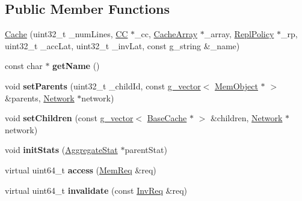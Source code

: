 \subsection*{Public Member Functions}
\begin{DoxyCompactItemize}
\item 
\hyperlink{classCache_a398112ee381973ef3777746a31900320}{Cache} (uint32\-\_\-t \-\_\-num\-Lines, \hyperlink{classCC}{C\-C} $\ast$\-\_\-cc, \hyperlink{classCacheArray}{Cache\-Array} $\ast$\-\_\-array, \hyperlink{classReplPolicy}{Repl\-Policy} $\ast$\-\_\-rp, uint32\-\_\-t \-\_\-acc\-Lat, uint32\-\_\-t \-\_\-inv\-Lat, const g\-\_\-string \&\-\_\-name)
\item 
\hypertarget{classCache_a723ba68ec1f3e8d46b536e003d2d31d4}{const char $\ast$ {\bfseries get\-Name} ()}\label{classCache_a723ba68ec1f3e8d46b536e003d2d31d4}

\item 
\hypertarget{classCache_a79ba01ab96d6949c8cf3f71cf310d9bd}{void {\bfseries set\-Parents} (uint32\-\_\-t \-\_\-child\-Id, const \hyperlink{classg__vector}{g\-\_\-vector}$<$ \hyperlink{classMemObject}{Mem\-Object} $\ast$ $>$ \&parents, \hyperlink{classNetwork}{Network} $\ast$network)}\label{classCache_a79ba01ab96d6949c8cf3f71cf310d9bd}

\item 
\hypertarget{classCache_a5c6c05094ed04256fd6f77a3ca20673e}{void {\bfseries set\-Children} (const \hyperlink{classg__vector}{g\-\_\-vector}$<$ \hyperlink{classBaseCache}{Base\-Cache} $\ast$ $>$ \&children, \hyperlink{classNetwork}{Network} $\ast$network)}\label{classCache_a5c6c05094ed04256fd6f77a3ca20673e}

\item 
\hypertarget{classCache_a3cd51a37ecac027028c662279fed96e3}{void {\bfseries init\-Stats} (\hyperlink{classAggregateStat}{Aggregate\-Stat} $\ast$parent\-Stat)}\label{classCache_a3cd51a37ecac027028c662279fed96e3}

\item 
\hypertarget{classCache_a7d23c3978dca10511edbfba724489a14}{virtual uint64\-\_\-t {\bfseries access} (\hyperlink{structMemReq}{Mem\-Req} \&req)}\label{classCache_a7d23c3978dca10511edbfba724489a14}

\item 
\hypertarget{classCache_a2b21fdc8a63f1c1a60b84643debe82db}{virtual uint64\-\_\-t {\bfseries invalidate} (const \hyperlink{structInvReq}{Inv\-Req} \&req)}\label{classCache_a2b21fdc8a63f1c1a60b84643debe82db}


\end{DoxyCompactItemize}

